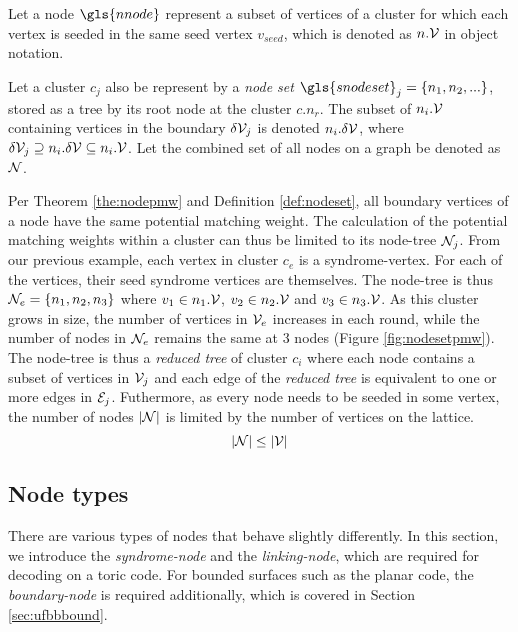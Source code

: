 \begin{definition}\label{def:node}
  Let a node $\gls{nnode}$ represent a subset of vertices of a cluster for which each vertex is seeded in the same seed vertex $v_{seed}$, which is denoted as $n.\mathcal{V}$ in object notation. 
\end{definition}

\begin{definition}\label{def:nodeset}
  Let a cluster $c_j$ also be represent by a \emph{node set} $\gls{snodeset}_j = \{n_1, n_2, ...\}$, stored as a tree by its root node at the cluster $c.n_r$. The subset of $n_i.\mathcal{V}$ containing vertices in the boundary $\delta\mathcal{V}_j$ is denoted $n_i.\delta\mathcal{V}$, where $\delta\mathcal{V}_j \supseteq n_i.\delta\mathcal{V} \subseteq n_i.\mathcal{V}$. Let the combined set of all nodes on a graph be denoted as $\mathcal{N}$.
\end{definition}

Per Theorem \ref{the:nodepmw} and Definition \ref{def:nodeset}, all boundary vertices of a node have the same potential matching weight. The calculation of the potential matching weights within a cluster can thus be limited to its node-tree $\mathcal{N}_j$. From our previous example, each vertex in cluster $c_e$ is a syndrome-vertex. For each of the vertices, their seed syndrome vertices are themselves. The node-tree is thus $\mathcal{N}_e = \{n_1, n_2, n_3\}$ where $v_1 \in n_1.\mathcal{V}$, $v_2 \in n_2.\mathcal{V}$ and $v_3 \in n_3.\mathcal{V}$. As this cluster grows in size, the number of vertices in $\mathcal{V}_e$ increases in each round, while the number of nodes in $\mathcal{N}_e$ remains the same at 3 nodes (Figure \ref{fig:nodesetpmw}). The node-tree is thus a \emph{reduced tree} of cluster $c_i$ where each node contains a subset of vertices in $\mathcal{V}_j$ and each edge of the \emph{reduced tree} is equivalent to one or more edges in $\mathcal{E}_j$. Futhermore, as every node needs to be seeded in some vertex, the number of nodes $|\mathcal{N}|$ is limited by the number of vertices on the lattice. 
\begin{equation}\label{eq:sets}  
  \abs{\mathcal{N}} \leq \abs{\mathcal{V}} 
\end{equation}


\subsection{Node types}

There are various types of nodes that behave slightly differently. In this section, we introduce the \emph{syndrome-node} and the \emph{linking-node}, which are required for decoding on a toric code. For bounded surfaces such as the planar code, the \emph{boundary-node} is required additionally, which is covered in Section \ref{sec:ufbbbound}. 

